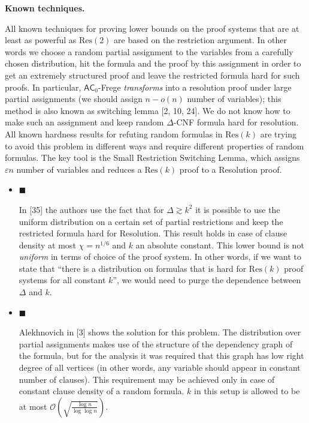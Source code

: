 \par\medskip\noindent\textbf{Known techniques.}\par




All known techniques for proving lower bounds on the proof systems that
are at least as powerful as $\mathrm{Res}(2)$ are based on the restriction argument. In other words we choose a
random partial assignment to the variables from a carefully chosen distribution, hit the formula and the
proof by this assignment in order to get an extremely structured proof and leave the restricted formula
hard for such proofs. In particular, ${\mathsf{AC}}_{0}$-Frege \emph{transforms} into a resolution proof under large
partial assignments (we should assign $n-o(n)$ number of variables); this method is also known as
switching lemma [2, 10, 24]. We do not know how to make such an assignment and keep
random $\Delta$-CNF formula hard for resolution. All known hardness results for refuting random formulas
in $\mathrm{Res}(k)$ are trying to avoid this problem in different ways and require different properties of
random formulas. The key tool is the Small Restriction Switching Lemma, which assigns $\varepsilon n$
number of variables and reduces a $\mathrm{Res}(k)$ proof to a Resolution proof.\par


\begin{itemize}


\item[] 
$\blacksquare$ 


In [35] the authors use the fact that for $\Delta\gtrsim k^{2}$ it is
possible to use the uniform distribution on a certain set of partial restrictions and keep
the restricted formula hard for Resolution. This result holds
in case of clause density at most $\chi=n^{1/6}$ and $k$ an absolute constant. This lower
bound is not \emph{uniform} in terms of choice of the proof system. In other words, if we want to
state that “there is a distribution on formulas that is hard for $\mathrm{Res}(k)$ proof systems for all
constant $k$”, we would need to purge the dependence between $\Delta$ and $k$.\par





\item[] 
$\blacksquare$ 


Alekhnovich in [3] shows the solution for this problem. The distribution over
partial assignments makes use of the structure of the dependency graph of the formula, but for the
analysis it was required that this graph has low right degree of all vertices (in other words, any
variable should appear in constant number of clauses). This requirement may be achieved only in
case of constant clause density of a random formula. $k$ in this setup is allowed to be at most
$\mathcal{O}\left(\sqrt{\frac{\log n}{\log\log n}}\right)$.\par





\end{itemize}


